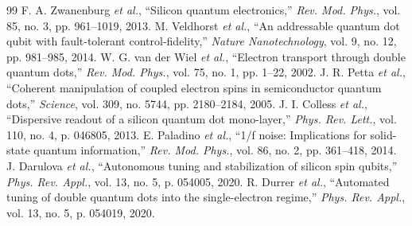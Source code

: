 \documentclass[journal,twocolumn,10pt]{IEEEtran}
\begin{document}
\begin{thebibliography}{99}
 F. A. Zwanenburg \textit{et al.}, ``Silicon quantum electronics,'' \textit{Rev. Mod. Phys.}, vol. 85, no. 3, pp. 961--1019, 2013.
 M. Veldhorst \textit{et al.}, ``An addressable quantum dot qubit with fault-tolerant control-fidelity,'' \textit{Nature Nanotechnology}, vol. 9, no. 12, pp. 981--985, 2014.
 W. G. van der Wiel \textit{et al.}, ``Electron transport through double quantum dots,'' \textit{Rev. Mod. Phys.}, vol. 75, no. 1, pp. 1--22, 2002.
 J. R. Petta \textit{et al.}, ``Coherent manipulation of coupled electron spins in semiconductor quantum dots,'' \textit{Science}, vol. 309, no. 5744, pp. 2180--2184, 2005.
 J. I. Colless \textit{et al.}, ``Dispersive readout of a silicon quantum dot mono-layer,'' \textit{Phys. Rev. Lett.}, vol. 110, no. 4, p. 046805, 2013.
 E. Paladino \textit{et al.}, ``1/f noise: Implications for solid-state quantum information,'' \textit{Rev. Mod. Phys.}, vol. 86, no. 2, pp. 361--418, 2014.
 J. Darulova \textit{et al.}, ``Autonomous tuning and stabilization of silicon spin qubits,'' \textit{Phys. Rev. Appl.}, vol. 13, no. 5, p. 054005, 2020.
 R. Durrer \textit{et al.}, ``Automated tuning of double quantum dots into the single-electron regime,'' \textit{Phys. Rev. Appl.}, vol. 13, no. 5, p. 054019, 2020.
\end{thebibliography}
\end{document}
